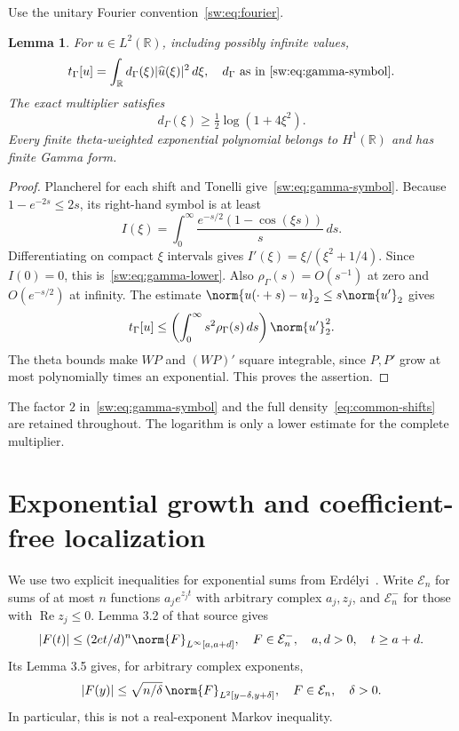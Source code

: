 \documentclass[11pt,a4paper]{article}
\numberwithin{equation}{section}
\newtheorem{lemma}[theorem]{Lemma}
\theoremstyle{definition}\newtheorem{definition}[theorem]{Definition}
\theoremstyle{remark}\newtheorem{remark}[theorem]{Remark}
\newcommand{\R}{\mathbb R}\newcommand{\C}{\mathbb C}\newcommand{\N}{\mathbb N}
\newcommand{\tg}{t_\Gamma}\newcommand{\cg}{c_\Gamma}
\DeclareMathOperator{\Rea}{Re}\DeclareMathOperator{\Ima}{Im}
\begin{document}
Use the unitary Fourier convention~\eqref{sw:eq:fourier}.
\begin{lemma}\label{sw:lem:gamma}
For $u\in L^2(\R)$, including possibly infinite values,
\[\tg[u]=\int_\R d_\Gamma(\xi)|\widehat u(\xi)|^2\,d\xi,\quad d_\Gamma\text{ as in~\eqref{sw:eq:gamma-symbol}}.\]
The exact multiplier satisfies
\begin{equation}\label{sw:eq:gamma-lower}
 d_\Gamma(\xi)\ge\tfrac12\log(1+4\xi^2).
\end{equation}
Every finite theta-weighted exponential polynomial belongs to $H^1(\R)$ and has finite Gamma form.
\end{lemma}
\begin{proof}
Plancherel for each shift and Tonelli give~\eqref{sw:eq:gamma-symbol}. Because $1-e^{-2s}\le2s$, its right-hand symbol is at least
\[
 I(\xi)=\int_0^\infty\frac{e^{-s/2}(1-\cos(\xi s))}{s}\,ds.
\]
Differentiating on compact $\xi$ intervals gives
$I'(\xi)=\xi/(\xi^2+1/4)$. Since $I(0)=0$, this is~\eqref{sw:eq:gamma-lower}. Also $\rho_\Gamma(s)=O(s^{-1})$ at zero and $O(e^{-s/2})$ at infinity. The estimate
$\norm{u(\cdot+s)-u}_2\le s\norm{u'}_2$ gives
\[
 \tg[u]\le\left(\int_0^\infty s^2\rho_\Gamma(s)\,ds\right)\norm{u'}_2^2.
\]
The theta bounds make $WP$ and $(WP)'$ square integrable, since $P,P'$ grow at most polynomially times an exponential. This proves the assertion.
\end{proof}
The factor $2$ in~\eqref{sw:eq:gamma-symbol} and the full density~\eqref{eq:common-shifts} are retained throughout. The logarithm is only a lower estimate for the complete multiplier.

\section{Exponential growth and coefficient-free localization}\label{sw:sec:localization}
We use two explicit inequalities for exponential sums from Erd\'elyi~\cite{Erdelyi}. Write $\mathcal E_n$ for sums of at most $n$ functions $a_je^{z_jt}$ with arbitrary complex $a_j,z_j$, and $\mathcal E_n^-$ for those with $\Rea z_j\le0$. Lemma 3.2 of that source gives
\begin{equation}\label{sw:eq:erd-growth}
 |F(t)|\le(2et/d)^n\norm{F}_{L^\infty[a,a+d]},
 \quad F\in\mathcal E_n^-,\quad a,d>0,\quad t\ge a+d.
\end{equation}
Its Lemma 3.5 gives, for arbitrary complex exponents,
\begin{equation}\label{sw:eq:erd-interior}
 |F(y)|\le\sqrt{n/\delta}\,\norm{F}_{L^2[y-\delta,y+\delta]},
 \quad F\in\mathcal E_n,\quad \delta>0.
\end{equation}
In particular, this is not a real-exponent Markov inequality.
\end{document}
